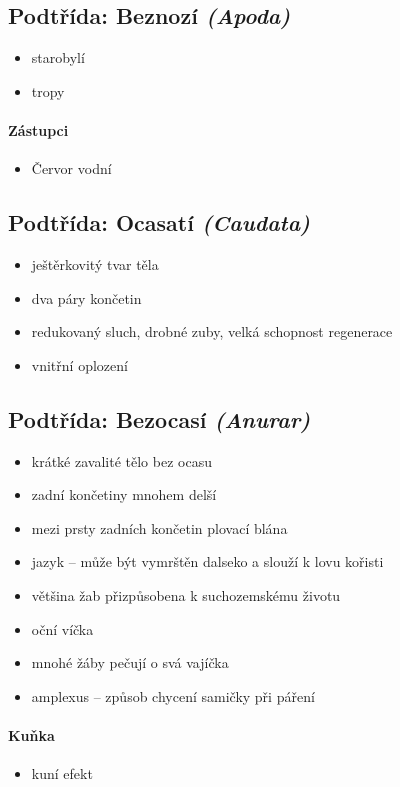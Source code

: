 \subsection{Podtřída: Beznozí \textit{(Apoda)}}
\begin{itemize}
\item starobylí
\item tropy
\end{itemize}

\paragraph{Zástupci}
\begin{itemize}
\item Červor vodní
\end{itemize}

\subsection{Podtřída: Ocasatí \textit{(Caudata)}}
\begin{itemize}
\item ještěrkovitý tvar těla
\item dva páry končetin
\item redukovaný sluch, drobné zuby, velká schopnost regenerace
\item vnitřní oplození
\end{itemize}

\subsection{Podtřída: Bezocasí \textit{(Anurar)}}
\begin{itemize}
\item krátké zavalité tělo bez ocasu
\item zadní končetiny mnohem delší
\item mezi prsty zadních končetin plovací blána
\item jazyk -- může být vymrštěn dalseko a slouží k lovu kořisti
\item většina žab přizpůsobena k suchozemskému životu
\item oční víčka
\item mnohé žáby pečují o svá vajíčka
\item amplexus -- způsob chycení samičky při páření
\end{itemize}

\paragraph{Kuňka}
\begin{itemize}
\item kuní efekt
\end{itemize}

